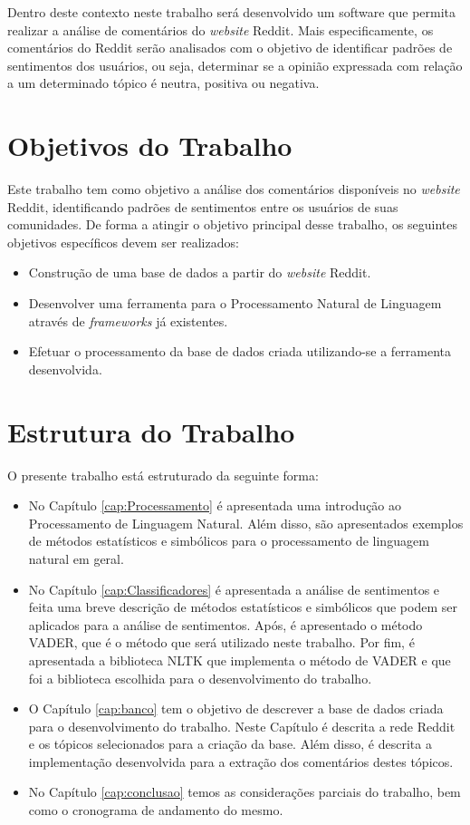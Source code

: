 Dentro deste contexto neste trabalho será desenvolvido um software que permita
realizar a análise de comentários do \textit{website} Reddit. Mais
especificamente, os comentários do Reddit serão analisados com o objetivo de
identificar padrões de sentimentos dos usuários, ou seja, determinar se a
opinião expressada com relação a um determinado tópico é neutra, positiva ou negativa.

\section{Objetivos do Trabalho}

Este trabalho tem como objetivo a análise dos comentários disponíveis no
\textit{website} Reddit, identificando padrões de sentimentos entre os
usuários de suas comunidades. De forma a atingir o objetivo principal desse
trabalho, os seguintes objetivos específicos devem ser realizados:
\begin{itemize}
  
 \item Construção de uma base de dados a partir do \textit{website} Reddit.
 \item Desenvolver uma ferramenta para o Processamento Natural de Linguagem
 através de \textit{frameworks} já existentes.
 \item Efetuar o processamento da base de dados criada utilizando-se a
 ferramenta desenvolvida.
\end{itemize}

\section{Estrutura do Trabalho}

O presente trabalho está estruturado da seguinte forma: 
\begin{itemize}
  \item No Capítulo \ref{cap:Processamento} é apresentada uma introdução ao
  Processamento de Linguagem Natural. Além disso, são apresentados exemplos de
  métodos estatísticos e simbólicos para o processamento de linguagem natural
  em geral.
  \item No Capítulo \ref{cap:Classificadores} é
  apresentada a análise de sentimentos e feita uma breve descrição de métodos
  estatísticos e simbólicos que podem ser aplicados para a análise de
  sentimentos. Após, é apresentado o método \ac{VADER}, que é o método que será
  utilizado neste trabalho. Por fim, é apresentada a biblioteca \ac{NLTK} que implementa o método de
  \ac{VADER} e que foi a biblioteca escolhida para o desenvolvimento do
  trabalho.
  \item O Capítulo \ref{cap:banco} tem
o objetivo de descrever a base de dados criada para o desenvolvimento do
trabalho.
Neste Capítulo é descrita a rede Reddit e os tópicos selecionados para a criação
da base. Além disso, é descrita a implementação desenvolvida para a extração dos
comentários destes tópicos.
\item No Capítulo \ref{cap:conclusao} temos as considerações parciais do
trabalho, bem como o cronograma de andamento do mesmo.
\end{itemize}

